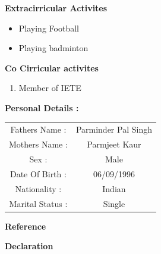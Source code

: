 \documentclass{article}
\begin{document}
\begin{flushleft}
\textbf{Extracirricular Activites}
\begin{flushright}
\begin{itemize}
\item Playing Football
\item Playing badminton
\end{itemize} 
\end{flushright}
\end{flushleft}



\begin{flushleft}
\textbf{Co Cirricular activites }
\begin{flushright}
\begin{enumerate}
\item Member of IETE
\end{enumerate} 
\end{flushright}
\end{flushleft}



\begin{flushleft}
\textbf {Personal Details :  }
\vskip 0.2cm
\hspace{1.4in}
\begin{tabular}{ cc } 
 \hfill Fathers Name : & Parminder Pal Singh \\ 
 \hfill Mothers Name : & Parmjeet Kaur \\  
 \hfill Sex : & Male   \\ 
 \hfill Date Of Birth : & 06/09/1996  \\
 \hfill Nationality : & Indian  \\
 \hfill Marital Status : & Single
\end{tabular}
\end{flushleft}





\begin{flushleft}
\textbf{Reference}
\end{flushleft}

\vskip 0.3cm


\begin{flushleft}
\textbf{Declaration}
\end{flushleft}
\end{document}
